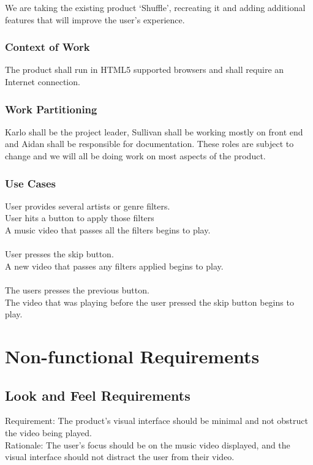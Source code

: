 \documentclass[12pt, titlepage]{article}
\begin{document}
We are taking the existing product ‘Shuffle’, recreating it and adding additional features that will improve the user's experience.

\subsubsection{Context of Work}

The product shall run in HTML5 supported browsers and shall require an Internet connection.

\subsubsection{Work Partitioning}

Karlo shall be the project leader, Sullivan shall be working mostly on front end and Aidan shall be responsible for documentation.  These roles are subject to change and we will all be doing work on most aspects of the product.

\subsubsection{Use Cases}

User provides several artists or genre filters.\\
User hits a button to apply those filters\\
A music video that passes all the filters begins to play.\\\\
User presses the skip button.\\
A new video that passes any filters applied begins to play.\\\\
The users presses the previous button. \\
The video that was playing before the user pressed the skip button begins to play.\\


\section{Non-functional Requirements}

\subsection{Look and Feel Requirements}
Requirement: The product's visual interface should be minimal and not obstruct the video being played.\\
Rationale: The user's focus should be on the music video displayed, and the visual interface should not distract the user from their video.
\end{document}
